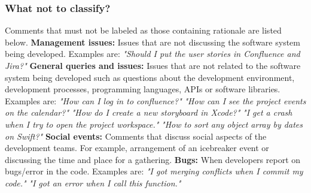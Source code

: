 \documentclass[a4paper,12pt,twoside]{report}
\begin{document}
\begin{appendices}
\subsubsection{What not to classify?}
Comments that must not be labeled as those containing rationale are listed below. 
\newline \newline
\textbf{Management issues:} Issues that are not discussing the software system being developed. Examples are:
\newline \newline 
\textit{"Should I put the user stories in Confluence and Jira?"}
\newline \newline 
\textbf{General queries and issues:} Issues that are not related to the software system being developed such as questions about the development environment, development processes, programming languages, APIs or software libraries. Examples are:
\newline \newline 
\textit{"How can I log in to confluence?"}
\newline \newline 
\textit{"How can I see the project events on the calendar?"}
\newline \newline 
\textit{"How do I create a new storyboard in Xcode?"}
\newline \newline 
\textit{"I get a crash when I try to open the project workspace."}
\newline \newline 
\textit{"How to sort any object array by dates on Swift?"}
\newline \newline 
\textbf{Social events:} Comments that discuss social aspects of the development teams. For example, arrangement of an icebreaker event or discussing the time and place for a gathering.
\newline \newline 
\textbf{Bugs:} When developers report on bugs/error in the code. Examples are: 
\newline \newline 
\textit{"I got merging conflicts when I commit my code."}
\newline \newline 
\textit{"I got an error when I call this function."}
\newline \newline 

\end{appendices}
\end{document}
